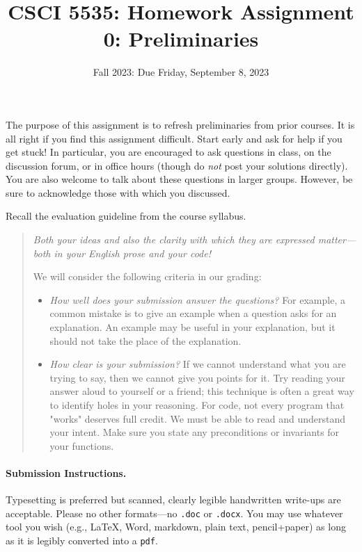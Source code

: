 \documentclass[12pt]{exam}
\title{CSCI 5535: Homework Assignment 0: Preliminaries}
\date{Fall 2023: Due Friday, September 8, 2023}
\author{}
\begin{document}
\maketitle

The purpose of this assignment is to refresh preliminaries from prior
courses. It is all right if you find this assignment difficult. Start early and ask for
help if you get stuck! In particular, you are encouraged to ask
questions in class, on the discussion forum, or in office hours (though do
\emph{not} post your solutions directly).
%
You are also welcome to talk about these questions in larger groups. However, be
sure to acknowledge those with which you discussed.

Recall the evaluation guideline from the course syllabus.
\begin{quote}\em
  Both your ideas and also the clarity with which they are expressed
  matter---both in your English prose and your code!

  We will consider the following criteria in our grading: 
  \begin{itemize}
    \item \emph{How well does your submission answer the questions?}
      For example, a common mistake is to give an example when a question
      asks for an explanation.  An example may be useful in your
      explanation, but it should not take the place of the explanation.
    \item \emph{How clear is your submission?}  If we cannot
      understand what you are trying to say, then we cannot give you
      points for it.  Try reading your answer aloud to yourself or a
      friend; this technique is often a great way to identify holes in
      your reasoning.  For code, not every program that "works"
      deserves full credit. We must be able to read and understand
      your intent.  Make sure you state any preconditions or
      invariants for your functions.
  \end{itemize}
\end{quote}

\paragraph{Submission Instructions.}

Typesetting is preferred but scanned, clearly legible handwritten write-ups are acceptable. Please no other formats---no
\texttt{.doc} or \texttt{.docx}. You may use whatever tool you wish (e.g., \LaTeX, Word, markdown, plain text, pencil+paper) as long as it is legibly
converted into a \texttt{pdf}.
\end{document}

